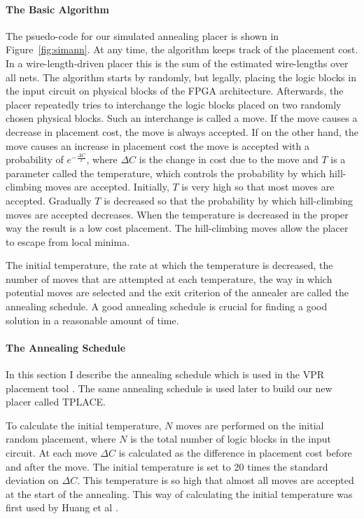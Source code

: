 \documentclass[a4paper,oneside,12pt]{article}
\begin{document}
\paragraph{The Basic Algorithm}
The psuedo-code for our simulated annealing placer is shown in Figure~\ref{fig:simann}. At any time, the algorithm keeps track of the placement cost. In a wire-length-driven placer this is the sum of the estimated wire-lengths over all nets. The algorithm starts by randomly, but legally, placing the logic blocks in the input circuit on physical blocks of the FPGA architecture. Afterwards, the placer repeatedly tries to interchange the logic blocks placed on two randomly chosen physical blocks. Such an interchange is called a move. If the move causes a decrease in placement cost, the move is always accepted. If on the other hand, the move causes an increase in placement cost the move is accepted with a probability of $e^{-\frac{\Delta C}{T}}$, where $\Delta C$ is the change in cost due to the move and $T$ is a parameter called the temperature, which controls the probability by which hill-climbing moves are accepted. Initially, $T$ is very high so that most moves are accepted. Gradually $T$ is decreased so that the probability by which hill-climbing moves are accepted decreases. When the temperature is decreased in the proper way the result is a low cost placement. The hill-climbing moves allow the placer to escape from local minima.


The initial temperature, the rate at which the temperature is decreased, the number of moves that are attempted at each temperature, the way in which potential moves are selected and the exit criterion of the annealer are called the annealing schedule. A good annealing schedule is crucial for finding a good solution in a reasonable amount of time.

\paragraph{The Annealing Schedule}
In this section I describe the annealing schedule which is used in the VPR placement tool \cite{betz1999aacfdf}. The same annealing schedule is used later to build our new placer called {\sc TPLACE}.

To calculate the initial temperature, $N$ moves are performed on the initial random placement, where $N$ is the total number of logic blocks in the input circuit. At each move $\Delta C$ is calculated as the difference in placement cost before and after the move. The initial temperature is set to 20 times the standard deviation on $\Delta C$. This temperature is so high that almost all moves are accepted at the start of the annealing. This way of calculating the initial temperature was first used by Huang et al \cite{huang1986aegcsfsa}.
\end{document}
